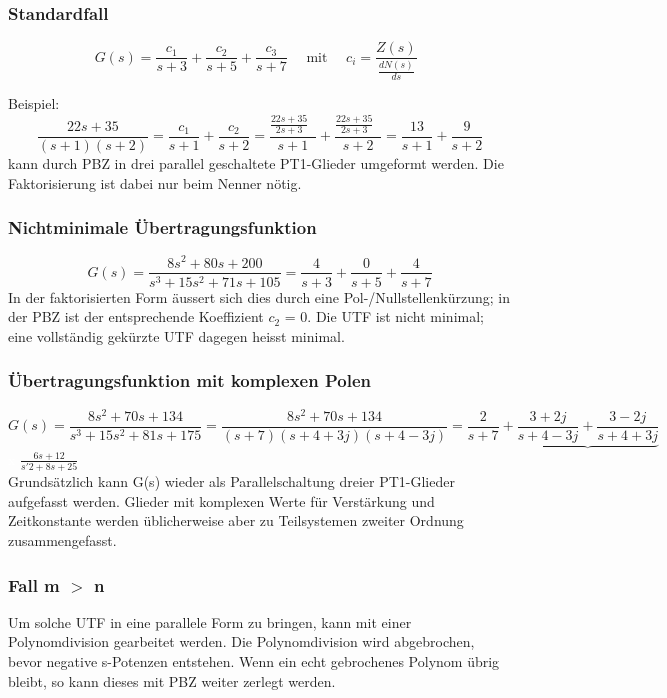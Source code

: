\subsubsection{Standardfall}

\[ G(s) =\frac{c_{1}}{s+3} + \frac{c_{2}}{s+5} + \frac{c_{3}}{s+7} \quad \text{ mit } \quad {c_{i}= \frac{Z(s)}{\frac{dN(s)}{ds}}\mathop{\Bigg|_{s=p_{i}}}}\]

Beispiel: \[\frac{22s +35}{(s+1)(s+2)}=\frac{c_{1}}{s+1}+\frac{c_{2}}{s+2}=\frac{\frac{22s+35}{2s+3}\mathop{\Big|_{s=-1}}}{s+1}+\frac{\frac{22s+35}{2s+3}\mathop{\Big|_{s=-2}}}{s+2}=\frac{13}{s+1}+\frac{9}{s+2}\]
kann durch PBZ in drei parallel geschaltete PT1-Glieder umgeformt werden. Die
Faktorisierung ist dabei nur beim Nenner nötig.

\subsubsection{Nichtminimale Übertragungsfunktion}
\[G(s) =\frac{8s^{2} + 80s + 200}{s^3 + 15s^2 + 71s + 105}= \frac{4}{s+3} + \frac{0}{s+5} + \frac{4}{s+7}\]
In der faktorisierten Form äussert sich dies durch eine Pol-/Nullstellenkürzung; in der PBZ ist der entsprechende Koeffizient $c_{2}$ = 0. Die UTF ist nicht minimal; eine vollständig gekürzte UTF dagegen heisst minimal. \\

\subsubsection{Übertragungsfunktion mit komplexen Polen}
\[G(s) =\frac{8s^{2} + 70s + 134}{s^3 + 15s^2 + 81s + 175}= \frac{8s^2+70s+134}{(s+7)(s+4+3j)(s+4-3j)}=\frac{2}{s+7}+\underbrace{\frac{3+2j}{s+4-3j}+\frac{3-2j}{s+4+3j}}\]
\textcolor{white}{x} \hspace{14.5cm} $\frac{6s+12}{s'2+8s+25}$\\

Grundsätzlich kann G(s) wieder als Parallelschaltung dreier PT1-Glieder aufgefasst
werden. Glieder mit komplexen Werte für Verstärkung und Zeitkonstante werden
üblicherweise aber zu Teilsystemen zweiter Ordnung zusammengefasst.

\subsubsection{Fall m $>$ n}
Um solche UTF in eine
parallele Form zu bringen, kann mit einer Polynomdivision gearbeitet werden. Die Polynomdivision wird abgebrochen, bevor negative s-Potenzen entstehen. 
Wenn ein echt gebrochenes Polynom übrig bleibt, so kann dieses mit PBZ weiter zerlegt werden.



